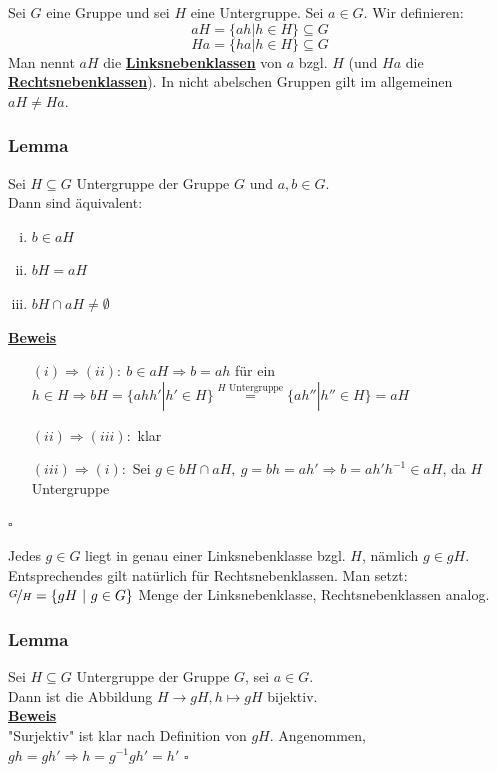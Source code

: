 \documentclass[a4paper, pagesize=pdftex, pdftex, twoside, headsepline, index=totoc,toc=listof, fontsize=10pt, cleardoublepage=empty, headinclude, DIV=13, BCOR=13mm]{scrartcl}
\newcommand{\bet}[1]{\uline{\textbf{#1}}} %
\begin{document}
Sei $G$ eine Gruppe und sei $H$ eine Untergruppe. Sei $a\in G$. Wir definieren:
\[aH=\{ah | h\in H\}\subseteq G\]
\[Ha=\{ha | h\in H\}\subseteq G\]
Man nennt $aH$ die \bet{Linksnebenklassen} von $a$ bzgl. $H$ (und $Ha$ die \bet{Rechtsnebenklassen}). In nicht abelschen Gruppen gilt im allgemeinen $aH\not=Ha$.

\subsubsection*{Lemma}
Sei $H\subseteq G$ Untergruppe der Gruppe $G$ und $a,b\in G$.\\
Dann sind äquivalent:
\begin{enumerate}[(i)]
	\item $b\in aH$
	\item $bH=aH$
	\item $bH \cap aH \not= \emptyset$
\end{enumerate}
\bet{Beweis}\\
\begin{itemize}
	\item[$(i)\Rightarrow (ii):~b\in aH \Rightarrow b=ah$ für ein $h\in H \Rightarrow bH=\{ahh' | h' \in H\} \stackrel{H\text{ Untergruppe}}{=}\{ah'' | h''\in H\}=aH$]
	\item[$(ii) \Rightarrow (iii):$ klar]
	\item[$(iii) \Rightarrow (i):$ Sei $g \in bH \cap aH,~g=bh=ah' \Rightarrow b=ah'h^{-1} \in aH$, da $H$ Untergruppe]
\end{itemize}
\hfill $\square$

Jedes $g\in G$ liegt in genau einer Linksnebenklasse bzgl. $H$, nämlich $g \in gH$.
Entsprechendes gilt natürlich für Rechtsnebenklassen. Man setzt:\\
$\nicefrac{G}{H}=\{gH~|~g \in G \}$ Menge der Linksnebenklasse, Rechtsnebenklassen analog.

\subsubsection*{Lemma}
Sei $H\subseteq G$ Untergruppe der Gruppe $G$, sei $a \in G$.\\
Dann ist die Abbildung $H \to gH, h \mapsto gH$ bijektiv.\\
\bet{Beweis}\\
"Surjektiv" ist klar nach Definition von $gH$. Angenommen, $gh=gh' \Rightarrow h=g^{-1}gh'=h'$
\hfill $\square$
\end{document}
